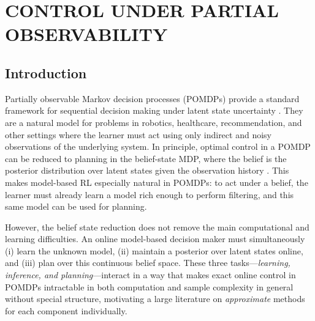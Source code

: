 \chapter{CONTROL UNDER PARTIAL OBSERVABILITY}
\label{ch:pomdp-control}




\section{Introduction}


Partially observable Markov decision processes (POMDPs) provide a standard framework for sequential decision making under latent state uncertainty \citep{kaelbling1998planning}. They are a natural model for problems in robotics, healthcare, recommendation, and other settings \citep{hauskrecht2000planning,pineau2003point} where the learner must act using only indirect and noisy observations of the underlying system. 
In principle, optimal control in a POMDP can be reduced to planning in the belief-state MDP, where the belief is the posterior distribution over latent states given the observation history \citep{cassandra1994acting,kaelbling1998planning}. This makes model-based RL especially natural in POMDPs: to act under a belief, the learner must already learn a model rich enough to perform filtering, and this same model can be used for planning. 

However, the belief state reduction does not remove the main computational and learning difficulties. An online model-based decision maker must simultaneously (i) learn the unknown model, (ii) maintain a posterior over latent states online, and (iii) plan over this continuous belief space. These three tasks---\textit{learning, inference, and planning}---interact in a way that makes exact online control in POMDPs intractable in both computation and sample complexity in general \citep{papadimitriou1987complexity} without special structure, motivating a large literature on \textit{approximate} methods for each component individually. 

